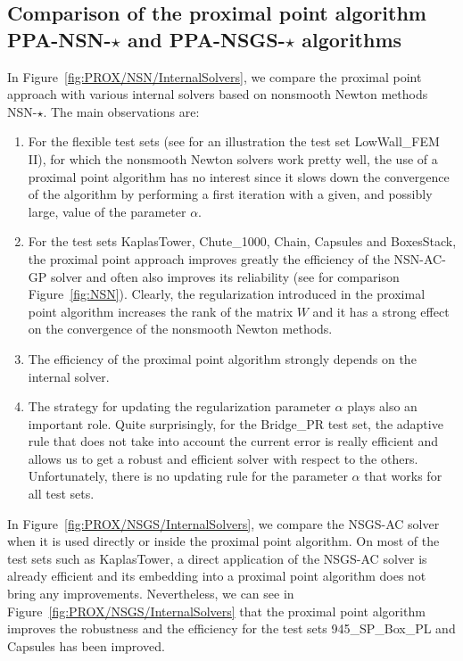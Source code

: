 \subsection{Comparison of the proximal point algorithm {\sf PPA-NSN-$\star$} and {\sf PPA-NSGS-$\star$}  algorithms}
\label{Sec:PROX/NSN/InternalSolvers}
In Figure~\ref{fig:PROX/NSN/InternalSolvers}, we compare the proximal point approach with various internal solvers based on nonsmooth Newton methods {\sf NSN-$\star$}. The main observations are:
\begin{enumerate}
\item For the flexible test sets (see for an illustration the test set LowWall\_FEM II), for which the nonsmooth Newton solvers work pretty well, the use of a proximal point algorithm has no interest since it slows down the convergence of the algorithm by performing a first iteration with a given, and possibly large, value of the parameter $\alpha$.
\item For the test sets KaplasTower,   Chute\_1000, Chain, Capsules and BoxesStack, the proximal point approach improves greatly the efficiency  of the {\sf NSN-AC-GP} solver and often also improves its reliability (see for comparison Figure~\ref{fig:NSN}). Clearly, the regularization introduced in the proximal point algorithm increases the rank of the matrix $W$ and it has a strong effect on the convergence of the nonsmooth  Newton methods.
\item The efficiency of the proximal point algorithm strongly depends on the internal solver. 
\item The strategy for updating the regularization parameter $\alpha$ plays also an important role. Quite surprisingly, for the Bridge\_PR test set, the adaptive rule that does not take into account the current error is really efficient and allows us to get a robust and efficient solver with respect to the others. Unfortunately, there is no updating rule for the parameter $\alpha$ that works for all test sets.
\end{enumerate}
In Figure~\ref{fig:PROX/NSGS/InternalSolvers}, we compare the {\sf NSGS-AC} solver when it is used directly or inside the proximal point algorithm. On most of the test sets such as KaplasTower, a direct application of the {\sf NSGS-AC} solver is already efficient and its embedding into a proximal point algorithm does not bring any improvements. Nevertheless, we can see in Figure~\ref{fig:PROX/NSGS/InternalSolvers} that the proximal point algorithm improves the robustness and the efficiency for the test sets 945\_SP\_Box\_PL  and Capsules has been improved. 

